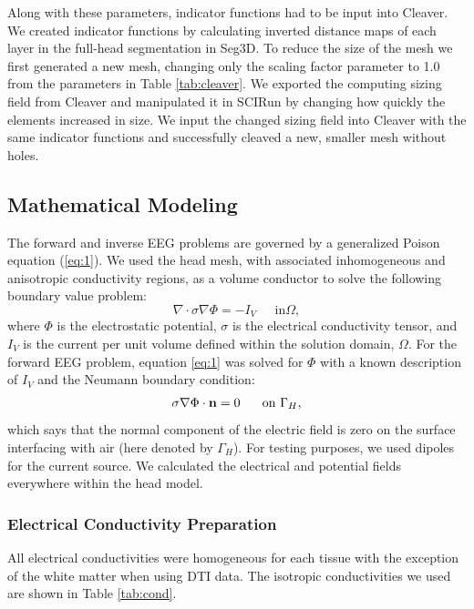 Along with these parameters, indicator functions had to be input into Cleaver. We created indicator functions by calculating inverted distance maps of each layer in the full-head segmentation in Seg3D. To reduce the size of the mesh we first generated a new mesh, changing only the scaling factor parameter to 1.0 from the parameters in Table \ref{tab:cleaver}. We exported the computing sizing field from Cleaver and manipulated it in SCIRun by changing how quickly the elements increased in size. We input the changed sizing field into Cleaver with the same indicator functions and successfully cleaved a new, smaller mesh without holes.

\subsection{Mathematical Modeling}
\label{sec:math}


The forward and inverse EEG problems are governed by a generalized Poison equation (\ref{eq:1}). We used the head mesh, with associated inhomogeneous and anisotropic conductivity regions, as a volume conductor to solve the following boundary value problem:
%
\begin{equation}
\label{eq:1} \nabla\cdot\sigma\nabla\Phi = -I_{V} \;\;\;\;\mbox{ in
}\Omega,
\end{equation} 
%
where $\Phi$ is the electrostatic potential, $\sigma$ is the electrical conductivity tensor, and $I_{V}$ is the current per unit volume defined within the solution domain, $\Omega$. For the forward EEG problem, equation \ref{eq:1} was solved for $\Phi$ with a known description of $I_{V}$ and the Neumann boundary condition:
%
\begin{equation} \sigma\nabla\Phi\cdot{\bf
n} = 0\;\;\;\;\;\mbox{ on }\Gamma_{H}, 
\end{equation} 
%
which says that the normal component of the electric field is zero on the surface interfacing with air (here denoted by $\Gamma_{H}$). For testing purposes, we used dipoles for the current source. We calculated the electrical and potential fields everywhere within the head model. \cite{SCI:Joh2015c}

\subsubsection{Electrical Conductivity Preparation}
\label{sec:cond}

All electrical conductivities were homogeneous for each tissue with the exception of the white matter when using DTI data. The isotropic conductivities \cite{ref:cond} we used are shown in Table \ref{tab:cond}.

